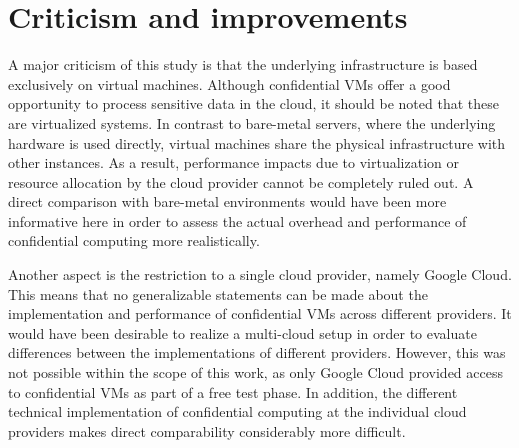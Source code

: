 \section{Criticism and improvements}

A major criticism of this study is that the underlying infrastructure is based exclusively on virtual machines. Although confidential VMs offer a good opportunity to process sensitive data in the cloud, it should be noted that these are virtualized systems. In contrast to bare-metal servers, where the underlying hardware is used directly, virtual machines share the physical infrastructure with other instances. As a result, performance impacts due to virtualization or resource allocation by the cloud provider cannot be completely ruled out. A direct comparison with bare-metal environments would have been more informative here in order to assess the actual overhead and performance of confidential computing more realistically.

Another aspect is the restriction to a single cloud provider, namely Google Cloud. This means that no generalizable statements can be made about the implementation and performance of confidential VMs across different providers. It would have been desirable to realize a multi-cloud setup in order to evaluate differences between the implementations of different providers. However, this was not possible within the scope of this work, as only Google Cloud provided access to confidential VMs as part of a free test phase. In addition, the different technical implementation of confidential computing at the individual cloud providers makes direct comparability considerably more difficult.
